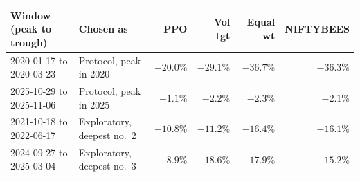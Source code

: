 \begin{tabular}{llrrrr}
\toprule
Window (peak to trough) & Chosen as & PPO & Vol tgt & Equal wt & NIFTYBEES \\
\midrule
2020-01-17 to 2020-03-23 & Protocol, peak in 2020 & $-20.0\%$ & $-29.1\%$ & $-36.7\%$ & $-36.3\%$ \\
2025-10-29 to 2025-11-06 & Protocol, peak in 2025 & $-1.1\%$ & $-2.2\%$ & $-2.3\%$ & $-2.1\%$ \\
2021-10-18 to 2022-06-17 & Exploratory, deepest no.~2 & $-10.8\%$ & $-11.2\%$ & $-16.4\%$ & $-16.1\%$ \\
2024-09-27 to 2025-03-04 & Exploratory, deepest no.~3 & $-8.9\%$ & $-18.6\%$ & $-17.9\%$ & $-15.2\%$ \\
\bottomrule
\end{tabular}
